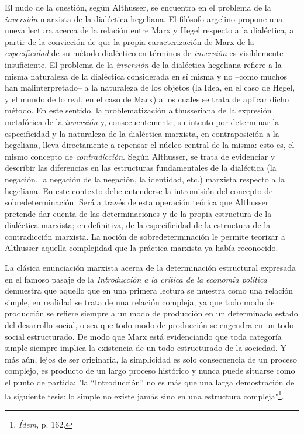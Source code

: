 \documentclass{book}
\begin{document}
El nudo de la cuestión, según Althusser, se encuentra en el problema de
la \emph{inversión} marxista de la dialéctica hegeliana. El filósofo
argelino propone una nueva lectura acerca de la relación entre Marx y
Hegel respecto a la dialéctica, a partir de la convicción de que la
propia caracterización de Marx de la \emph{especificidad} de su método
dialéctico en términos de \emph{inversión} es visiblemente insuficiente.
El problema de la \emph{inversión} de la dialéctica hegeliana refiere a
la misma naturaleza de la dialéctica considerada en sí misma y no --como
muchos han malinterpretado-- a la naturaleza de los objetos (la Idea, en
el caso de Hegel, y el mundo de lo real, en el caso de Marx) a los
cuales se trata de aplicar dicho método. En este sentido, la
problematización althusseriana de la expresión metafórica de la
\emph{inversión} y, consecuentemente, su intento por determinar la
especificidad y la naturaleza de la dialéctica marxista, en
contraposición a la hegeliana, lleva directamente a repensar el núcleo
central de la misma: esto es, el mismo concepto de \emph{contradicción}.
Según Althusser, se trata de evidenciar y describir las diferencias en
las estructuras fundamentales de la dialéctica (la negación, la negación
de la negación, la identidad, etc.) marxista respecto a la hegeliana. En
este contexto debe entenderse la intromisión del concepto de
sobredeterminación. Será a través de esta operación teórica que
Althusser pretende dar cuenta de las determinaciones y de la propia
estructura de la dialéctica marxista; en definitiva, de la especificidad
de la estructura de la contradicción marxista. La noción de
sobredeterminación le permite teorizar a Althusser aquella complejidad
que la práctica marxista ya había reconocido.

La clásica enunciación marxista acerca de la determinación estructural
expresada en el famoso pasaje de la \emph{Introducción a la crítica de
la economía política} demuestra que aquello que en una primera lectura
se muestra como una relación simple, en realidad se trata de una
relación compleja, ya que todo modo de producción se refiere siempre a
un modo de producción en un determinado estado del desarrollo social, o
sea que todo modo de producción se engendra en un todo social
estructurado. De modo que Marx está evidenciando que toda categoría
simple siempre implica la existencia de un todo estructurado de la
sociedad. Y más aún, lejos de ser originaria, la simplicidad es solo
consecuencia de un proceso complejo, es producto de un largo proceso
histórico y nunca puede situarse como el punto de partida: "la
``Introducción'' no es más que una larga demostración de la siguiente
tesis: lo simple no existe jamás sino en una estructura
compleja"\footnote{\emph{Ídem}, p. 162.}.
\end{document}
